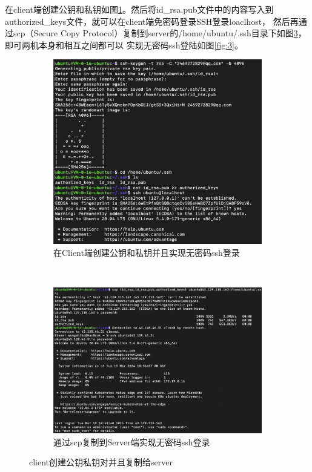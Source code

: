 \documentclass{ctexart}
\begin{document}
在client端创建公钥和私钥如图\ref{fig:1}。然后将id\_rsa.pub文件中的内容写入到authorized\_keys文件，就可以在client端免密码登录SSH登录loaclhost，
然后再通过scp（Secure Copy Protocol）复制到server的/home/ubuntu/.ssh目录下如图\ref{fig:2}，即可两机本身和相互之间都可以
实现无密码ssh登陆如图\ref{fig:3}。
\begin{figure}[ht]
    \centering
    \begin{subfigure}[b]{0.4\textwidth} 
        \centering
        \includegraphics[width=\textwidth]{client_login_ssh.png} 
        \caption{在Client端创建公钥和私钥并且实现无密码ssh登录}
        \label{fig:1}
    \end{subfigure}
    ~
    \begin{subfigure}[b]{0.4\textwidth}
        \centering
        \includegraphics[width=\textwidth]{scp_ssh_without_pwd.png}
        \caption{通过scp复制到Server端实现无密码ssh登录}
        \label{fig:2}
    \end{subfigure}
    \caption{client创建公钥私钥对并且复制给server}
\end{figure}
\end{document}
